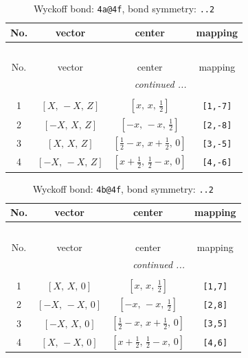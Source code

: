 \documentclass[fleqn,8pt]{jsarticle}
\begin{document}
\begin{longtable}{cccc}
\caption{Wyckoff bond: {\tt 4a@4f}, bond symmetry: {\tt ..2}}
 \\
 \hline \hline
No. & vector & center & mapping \\ \hline \endfirsthead

\multicolumn{3}{l}{\tablename\ \thetable{}} \\
 \hline \hline
No. & vector & center & mapping \\ \hline \endhead

 \hline \hline
\multicolumn{3}{r}{\footnotesize\it continued ...} \\ \endfoot

 \hline \hline
\multicolumn{3}{r}{} \\ \endlastfoot

1 & $\left[ X,\, - X,\, Z \right]$ & $\left[ x,\, x,\, \frac{1}{2} \right]$ & {\tt [1,-7]} \\ \hline
2 & $\left[ - X,\, X,\, Z \right]$ & $\left[ - x,\, - x,\, \frac{1}{2} \right]$ & {\tt [2,-8]} \\ \hline
3 & $\left[ X,\, X,\, Z \right]$ & $\left[ \frac{1}{2} - x,\, x + \frac{1}{2},\, 0 \right]$ & {\tt [3,-5]} \\ \hline
4 & $\left[ - X,\, - X,\, Z \right]$ & $\left[ x + \frac{1}{2},\, \frac{1}{2} - x,\, 0 \right]$ & {\tt [4,-6]} \\
\end{longtable}
\renewcommand{\arraystretch}{1.2}
\begin{longtable}{cccc}
\caption{Wyckoff bond: {\tt 4b@4f}, bond symmetry: {\tt ..2}}
 \\
 \hline \hline
No. & vector & center & mapping \\ \hline \endfirsthead

\multicolumn{3}{l}{\tablename\ \thetable{}} \\
 \hline \hline
No. & vector & center & mapping \\ \hline \endhead

 \hline \hline
\multicolumn{3}{r}{\footnotesize\it continued ...} \\ \endfoot

 \hline \hline
\multicolumn{3}{r}{} \\ \endlastfoot

1 & $\left[ X,\, X,\, 0 \right]$ & $\left[ x,\, x,\, \frac{1}{2} \right]$ & {\tt [1,7]} \\ \hline
2 & $\left[ - X,\, - X,\, 0 \right]$ & $\left[ - x,\, - x,\, \frac{1}{2} \right]$ & {\tt [2,8]} \\ \hline
3 & $\left[ - X,\, X,\, 0 \right]$ & $\left[ \frac{1}{2} - x,\, x + \frac{1}{2},\, 0 \right]$ & {\tt [3,5]} \\ \hline
4 & $\left[ X,\, - X,\, 0 \right]$ & $\left[ x + \frac{1}{2},\, \frac{1}{2} - x,\, 0 \right]$ & {\tt [4,6]} \\
\end{longtable}
\end{document}
